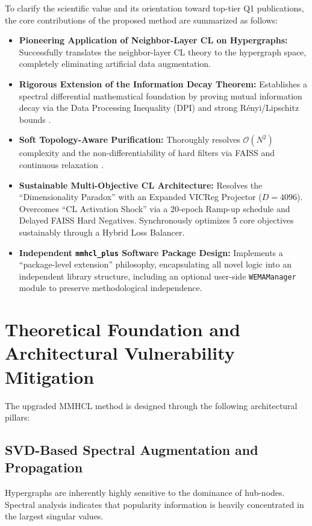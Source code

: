 \begin{tcolorbox}[contribstyle]
To clarify the scientific value and its orientation toward top-tier Q1 publications, the core contributions of the proposed method are summarized as follows:
\begin{itemize}[leftmargin=1.2em, itemsep=0.45em]
    \item \textbf{Pioneering Application of Neighbor-Layer CL on Hypergraphs:} Successfully translates the neighbor-layer CL theory to the hypergraph space, completely eliminating artificial data augmentation.
    \item \textbf{Rigorous Extension of the Information Decay Theorem:} Establishes a spectral differential mathematical foundation by proving mutual information decay via the Data Processing Inequality (DPI) and strong R\'enyi/Lipschitz bounds \cite{cover2006elements}.
    \item \textbf{Soft Topology-Aware Purification:} Thoroughly resolves $\mathcal{O}(N^2)$ complexity and the non-differentiability of hard filters via FAISS and continuous relaxation \cite{johnson2019faiss}.
    \item \textbf{Sustainable Multi-Objective CL Architecture:} Resolves the ``Dimensionality Paradox'' with an Expanded VICReg Projector ($D=4096$). Overcomes ``CL Activation Shock'' via a 20-epoch Ramp-up schedule and Delayed FAISS Hard Negatives. Synchronously optimizes 5 core objectives sustainably through a Hybrid Loss Balancer.
    \item \textbf{Independent \texttt{mmhcl\_plus} Software Package Design:} Implements a ``package-level extension'' philosophy, encapsulating all novel logic into an independent library structure, including an optional user-side \texttt{WEMAManager} module to preserve methodological independence.
\end{itemize}
\end{tcolorbox}

\section{Theoretical Foundation and Architectural Vulnerability Mitigation}
The upgraded MMHCL method is designed through the following architectural pillars:

\subsection{SVD-Based Spectral Augmentation and Propagation}
Hypergraphs are inherently highly sensitive to the dominance of hub-nodes. Spectral analysis indicates that popularity information is heavily concentrated in the largest singular values. 


